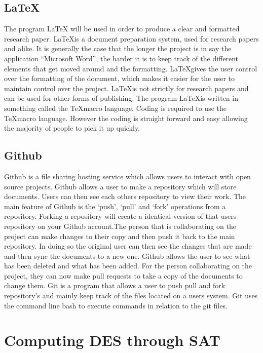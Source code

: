 \documentclass[11pt,a4paper]{report}
\begin{document}
\section{ \LaTeX}
\label{sec:LaTeX}
The program LaTeX will be used in order to produce a clear and formatted research paper. \LaTeX\space is a document preparation system, used for research papers and alike. It is generally the case that the longer the project is in say the application “Microsoft Word”, the harder it is to keep track of the different elements that get moved around and the formatting. \LaTeX\space gives the user control over the formatting of the document, which makes it easier for the user to maintain control over the project. \LaTeX\space is not strictly for research papers and can be used for other forms of publishing. The program \LaTeX\space is written in something called the \TeX\space macro language. Coding is required to use the \TeX\space macro language. However the coding is straight forward and easy allowing the majority of people to pick it up quickly.  

\section{Github}
\label{sec:Git}
Github is a file sharing hosting service which allows users to interact with open source projects. Github allows a user to make a repository which will store documents. Users can then see each others repository to view their work. The main feature of Github is the `push', `pull' and `fork' operations from a repository. Forking a repository will create a identical version of that users repository on your Github account.The person that is collaborating on the project can make changes to their copy and then push it back to the main repository. In doing so the original user can then see the changes that are made and then sync the documents to a new one. Github allows the user to see what has been deleted and what has been added. For the person collaborating on the project, they can now make pull requests to take a copy of the documents to change them. 
Git is a program that allows a user to push pull and fork repository's and mainly keep track of the files located on a users system. Git uses the command line bash to execute commands in relation to the git files.


\chapter{Computing DES through SAT}
\label{cha:DESsat}
\end{document}
